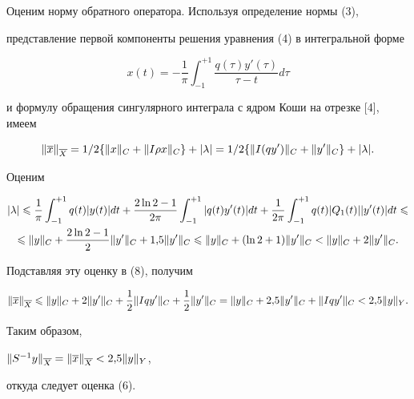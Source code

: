 \begin{pf}
Оценим норму обратного оператора. Используя определение нормы (3), 


представление первой компоненты решения уравнения (4) в интегральной форме


$$


x(t) = -\frac{1}{\pi} \int_{-1}^{+1} \frac{q(\tau)y'(\tau)}{\tau-t}d\tau


$$


и формулу обращения сингулярного интеграла с ядром Коши на отрезке [4], имеем


\begin{equation}


\|\ol{x}\|_{\ol{X}} = 1/2\{\|x\|_C + \|I\rho x\|_C\} + |\lambda| =


1/2\{\|I(qy')\|_C + \|y'\|_C\} + |\lambda|.


\end{equation}


Оценим


\begin{gather*}


|\lambda|\lea\frac{1}{\pi}\int_{-1}^{+1}q(t)|y(t)|dt +


\frac{2\ln 2 - 1}{2\pi}\int_{-1}^{+1}|q(t)y'(t)|dt +


\frac{1}{2\pi}\int_{-1}^{+1}q(t)|Q_1(t)||y'(t)|dt\lea \\


%


\lea\|y\|_C + \frac{2\ln 2 -1}{2}\|y'\|_C + 1{,}5\|y'\|_C\lea


\|y\|_C + (\ln 2 + 1)\|y'\|_C < \|y\|_C + 2\|y'\|_C.


\end{gather*}


Подставляя эту оценку в (8), получим


$$


\|\ol{x}\|_{\ol{X}} \lea \|y\|_C + 


2\|y'\|_C + \frac{1}{2}\|Iqy'\|_C + \frac{1}{2}\|y'\|_C =


\|y\|_C+2{,}5\|y'\|_C+\|Iqy'\|_C< 2{,}5\|y\|_Y.


$$


Таким образом,


$\|S^{-1}y\|_{\overline{X}} = \|\overline{x}\|_{\overline{X}} < 2{,}5\|y\|_Y$,


откуда следует оценка (6).


\end{pf}





